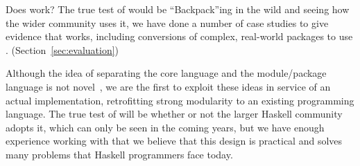 \begin{itemize}
    Does \Backpack{} work?
    The true test of \Backpack{} would be
    ``Backpack''ing in the wild and seeing how the wider community
    uses it, we have done a number of case studies to give evidence
    that \Backpack{} works, including conversions of complex,
    real-world packages to use \Backpack{}. (Section~\ref{sec:evaluation})


\end{itemize}
%
Although the idea of separating the core language and the module/package
language is not novel~\cite{leroy:modular,milner+:def-of-sml-revised,rossberg+:f-ing}, we are the first to exploit these ideas in service
of an actual implementation, retrofitting strong modularity to an existing
programming language.  The true test of \Backpack{} will be whether or not
the larger Haskell community adopts it, which can only be seen in the
coming years, but we have enough experience working with \Backpack{}
that we believe that this design is practical and solves many problems
that Haskell programmers face today.




